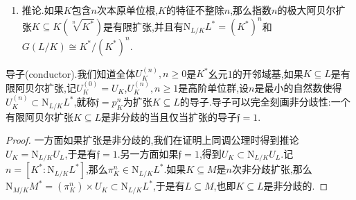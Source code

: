 \begin{enumerate}
\begin{proof}
		在抽象类域论中我们证明了相同的结论.在那里是对$G$模$A_K$赋予了范拓扑.这里我们仅需验证$K^*$在范拓扑下的开子群恰好就是在赋值拓扑下的有限指数开子群.先假设$\mathscr{N}$是$K^*$在范拓扑下的开子群.按照范拓扑定义它包含了形如$\mathrm{N}_{L/K}L^*$的子群,但这在$K^*$中是有限指数子群,于是$\mathscr{N}$是有限指数的.再说明它在赋值拓扑下是开的:首先上同调公理有$\mathrm{N}_{L/K}U_L=U_K$,这是赋值拓扑下的开子集,它包含在子群$\mathscr{N}$中,于是$\mathscr{N}$写成这个开子群的陪集的并,是开集的并,于是它是赋值拓扑下的开子群.下面需要证明赋值拓扑下的有限指数开子群$\mathscr{N}$是范拓扑下的开子群,等价于讲它包含一个范数群$\mathrm{N}_{L/K}L^*$(因为按照范拓扑定义这样的范数群是开的,包含开子群的子群肯定是开的,因为它是陪集的并),记指数为$n$,我们分特征情况:
		
		如果$\mathrm{char}(K)\not| n$,那么有$(K^*)^n\subset\mathscr{N}$.归结为证明$(K^*)^n$包含一个范群.不妨设$K^*$包含了一个$n$次单位根$\mu_n$,否则可以设$K_1=K(\mu_n)$,倘若我们找到了$(K_1^*)^n$所包含的范群$\mathrm{N}_{L_1/K_1}L_1^*$,选取$L$是包含$L_1$的$K$的有限Galois扩张,那么就有$\mathrm{N}_{L/K}L^*=\mathrm{N}_{K_1/K}(\mathrm{N}_{L/K_1}L^*)\subset\mathrm{N}_{K_1/K}(\mathrm{N}_{L_1/K_1}L_1^*)\subset\mathrm{N}_{K_1/K}((K_1^*)^n)\subset(K^*)^n$.
		
		于是不妨设$K$包含了一个$n$次单位根$\mu$.取$L=K(\sqrt[n]{K^*})$是$K$的极大的指数$n$的阿贝尔扩张,在Kummer理论中我们证明了$\mathrm{Hom}(G(L/K),\mu_n)\cong K^*/(K^*)^n$.在局部域理论中我们解释过这里$K^*/(K^*)^n$是有限的,于是这里$G(L/K)$必然是有限的.于是$K\subseteq L$是指数$n$的有限阿贝尔扩张.最后按照局部互反律有$K^*/\mathrm{N}_{L/K}L^*$同构于$G(L/K)$,于是它也是指数$n$的,于是$(K^*)^n\subset\mathrm{N}_{L/K}L^*$.但是$K^*/(K^*)^n$和$K^*/\mathrm{N}_{L/K}L^*$是阶数都是$|G(L/K)|$的群(因为此时有$\mathrm{Hom}(G,\mu_n)=\mathrm{Hom}(G,\mathbb{Q}/\mathbb{Z})\cong G$,其中$G$是有限阿贝尔群),这导致$(K^*)^n=\mathrm{N}_{L/K}L^*$.
		
		如果$\mathrm{char}(K)=p\mid n$可用Lubin-Tate理论,见后文.
	\end{proof}
    \item 推论.如果$K$包含$n$次本原单位根,$K$的特征不整除$n$,那么指数$n$的极大阿贝尔扩张$K\subseteq K(\sqrt[n]{K^*})$是有限扩张,并且有$\mathrm{N}_{L/K}L^*=(K^*)^n$和$G(L/K)\cong K^*/(K^*)^n$.
\end{enumerate}

导子(conductor).我们知道全体$U_K^{(n)},n\ge0$是$K^*$幺元1的开邻域基,如果$K\subseteq L$是有限阿贝尔扩张,记$U_K^{(0)}=U_K$,$U_K^{(n)},n\ge1$是高阶单位群,设$n$是最小的自然数使得$U_K^{(n)}\subset\mathrm{N}_{L/K}L^*$,就称$\mathfrak{f}=p_K^n$为扩张$K\subseteq L$的导子.导子可以完全刻画非分歧性:一个有限阿贝尔扩张$K\subseteq L$是非分歧的当且仅当扩张的导子$\mathfrak{f}=1$.
\begin{proof}
	
	一方面如果扩张是非分歧的,我们在证明上同调公理时得到推论$U_K=\mathrm{N}_{L/K}U_L$,于是有$\mathfrak{f}=1$.另一方面如果$\mathfrak{f}=1$,得到$U_K\subset\mathrm{N}_{L/K}U_L$.记$n=[K^*:\mathrm{N}_{L/K}L^*]$,那么$\pi_K^n\in\mathrm{N}_{L/K}L^*$.如果$K\subseteq M$是$n$次非分歧扩张,那么$\mathrm{N}_{M/K}M^*=(\pi_K^n)\times U_K\subset\mathrm{N}_{L/K}L^*$,于是有$L\subseteq M$,也即$K\subseteq L$是非分歧的.
\end{proof}

